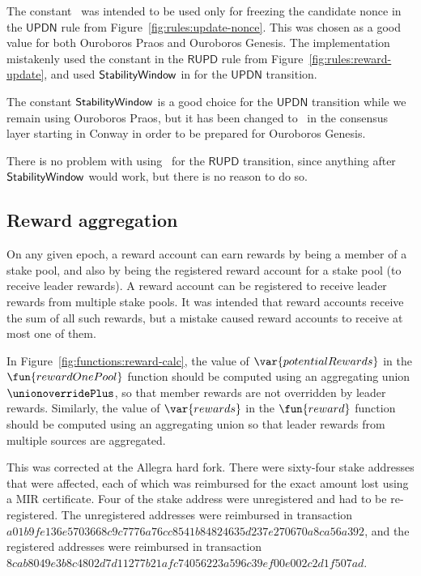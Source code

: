 The constant \RandomnessStabilisationWindow\ was intended to be used only
for freezing the candidate nonce in the $\mathsf{UPDN}$ rule
from Figure~\ref{fig:rules:update-nonce}.
This was chosen as a good value for both Ouroboros Praos and Ouroboros Genesis.
The implementation mistakenly used the constant in the $\mathsf{RUPD}$ rule
from Figure~\ref{fig:rules:reward-update}, and used $\mathsf{StabilityWindow}$
in for the $\mathsf{UPDN}$ transition.

The constant $\mathsf{StabilityWindow}$ is a good choice for the $\mathsf{UPDN}$
transition while we remain using Ouroboros Praos, but it has been changed to
\RandomnessStabilisationWindow\ in the consensus layer starting in Conway in
order to be prepared for Ouroboros Genesis.

There is no problem with using \RandomnessStabilisationWindow\ for the
$\mathsf{RUPD}$ transition, since anything after $\mathsf{StabilityWindow}$ would work,
but there is no reason to do so.

\subsection{Reward aggregation}
\label{sec:errata:reward-aggregation}

On any given epoch, a reward account can earn rewards by being a member of a stake pool,
and also by being the registered reward account for a stake pool (to receive leader rewards).
A reward account can be registered to receive leader rewards from multiple stake pools.
It was intended that reward accounts receive the sum of all such rewards,
but a mistake caused reward accounts to receive at most one of them.

In Figure~\ref{fig:functions:reward-calc}, the value of $\var{potentialRewards}$ in the
$\fun{rewardOnePool}$ function should be computed using an aggregating union
$\unionoverridePlus$, so that member rewards are not overridden by leader rewards.
Similarly, the value of $\var{rewards}$ in the $\fun{reward}$ function should be computed
using an aggregating union so that leader rewards from multiple sources are aggregated.

This was corrected at the Allegra hard fork.
There were sixty-four stake addresses that were affected,
each of which was reimbursed for the exact amount lost using a MIR certificate.
Four of the stake address were unregistered and had to be re-registered.
The unregistered addresses were reimbursed in transaction
\newline
$a01b9fe136e5703668c9c7776a76cc8541b84824635d237e270670a8ca56a392$,
and the registered addresses were reimbursed in transaction
\newline
$8cab8049e3b8c4802d7d11277b21afc74056223a596c39ef00e002c2d1f507ad$.

